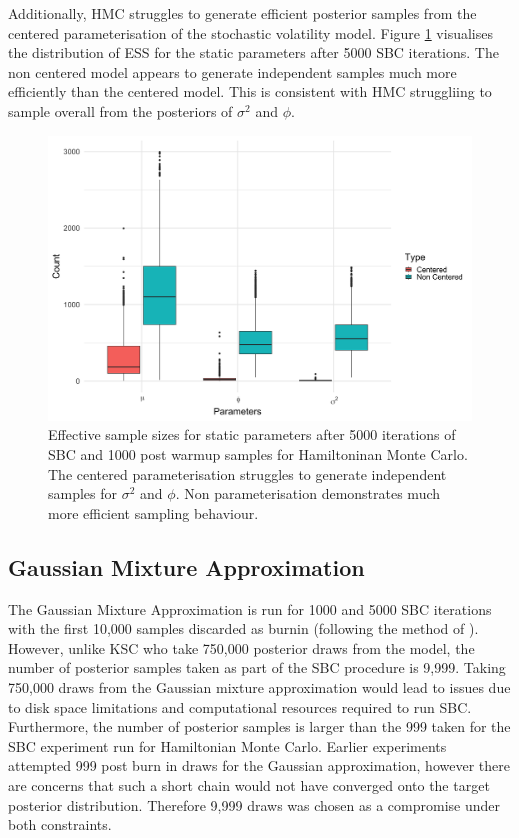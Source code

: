 \documentclass[12pt, a4paper]{article}
\begin{document}
    Additionally, HMC struggles to generate efficient posterior samples from the centered parameterisation of the stochastic volatility model. Figure \ref{fig:hmcess} visualises the distribution of ESS for the static parameters after 5000 SBC iterations. The non centered model appears to generate independent samples much more efficiently than the centered model. This is consistent with HMC struggliing to sample overall from the posteriors of $\sigma^2$ and $\phi$.

    \begin{figure}[H]
        \centering
        \includegraphics[scale=0.09]{results/hmc_ess.png}
        \caption{Effective sample sizes for static parameters after 5000 iterations of SBC and 1000 post warmup samples for Hamiltoninan Monte Carlo. The centered parameterisation struggles to generate independent samples for $\sigma^2$ and $\phi$. Non parameterisation demonstrates much more efficient sampling behaviour.}
        \label{fig:hmcess}
    \end{figure}

    \subsection{Gaussian Mixture Approximation}
    The Gaussian Mixture Approximation is run for 1000 and 5000 SBC iterations with the first 10,000 samples discarded as burnin (following the method of \citet{kim1998stochastic}). However, unlike KSC who take 750,000 posterior draws from the model, the number of posterior samples taken as part of the SBC procedure is 9,999. Taking 750,000 draws from the Gaussian mixture approximation would lead to issues due to disk space limitations and computational resources required to run SBC. Furthermore, the number of posterior samples is larger than the 999 taken for the SBC experiment run for Hamiltonian Monte Carlo. Earlier experiments attempted 999 post burn in draws for the Gaussian approximation, however there are concerns that such a short chain would not have converged onto the target posterior distribution. Therefore 9,999 draws was chosen as a compromise under both constraints. 
\end{document}
